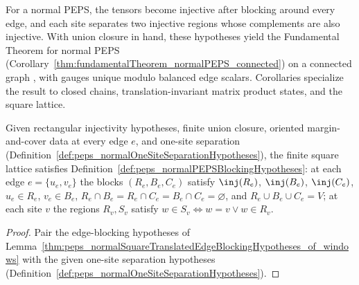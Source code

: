 For a normal PEPS, the tensors become injective after blocking around every edge,
and each site separates two injective regions whose complements are also injective.
With union closure in hand, these hypotheses yield the Fundamental
Theorem for normal PEPS (Corollary~\ref{thm:fundamentalTheorem_normalPEPS_connected})
on a connected graph \cite[Section~4]{Molnar2018NormalPEPS}, with gauges unique
modulo balanced edge scalars.
Corollaries specialize the result to closed chains, translation-invariant matrix
product states, and the square lattice.

\begin{lemma}%
    \label{thm:peps_normalSquarePEPSBlockingHypotheses_of_marginCovers}
    \leanok
    Given rectangular injectivity hypotheses, finite union closure, oriented
    margin-and-cover data at every edge $e$, and one-site separation
    (Definition~\ref{def:peps_normalOneSiteSeparationHypotheses}), the finite
    square lattice satisfies Definition~\ref{def:peps_normalPEPSBlockingHypotheses}:
    at each edge $e=\{u_e,v_e\}$ the blocks $(R_e,B_e,C_e)$ satisfy
    $\inj(R_e)$, $\inj(B_e)$, $\inj(C_e)$, $u_e\in R_e$, $v_e\in B_e$,
    $R_e\cap B_e=R_e\cap C_e=B_e\cap C_e=\varnothing$, and
    $R_e\cup B_e\cup C_e=V$; at each site $v$ the regions $R_v,S_v$ satisfy
    $w\in S_v\Longleftrightarrow w=v\lor w\in R_v$.
\end{lemma}
\begin{proof}\leanok
    Pair the edge-blocking hypotheses of
    Lemma~\ref{thm:peps_normalSquareTranslatedEdgeBlockingHypotheses_of_windows}
    with the given one-site separation hypotheses
    (Definition~\ref{def:peps_normalOneSiteSeparationHypotheses}).
\end{proof}

